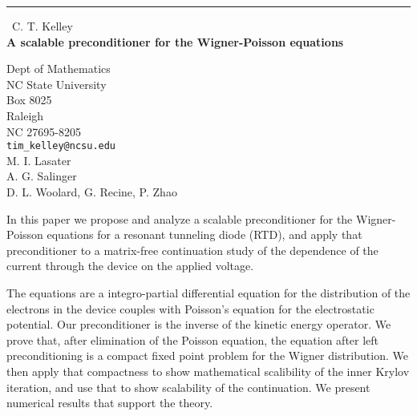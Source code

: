 \documentclass{report}
\begin{document}
\begin{center}
\rule{6in}{1pt} \
{\large C. T. Kelley \\
{\bf A scalable preconditioner for the Wigner-Poisson equations}}

Dept of Mathematics \\ NC State University \\ Box 8025 \\ Raleigh \\ NC 27695-8205
\\
{\tt tim_kelley@ncsu.edu}\\
M. I. Lasater\\
A. G. Salinger\\
	D. L. Woolard, G. Recine, P. Zhao\end{center}

In this paper we propose and analyze a scalable preconditioner for
the Wigner-Poisson equations for a resonant tunneling diode (RTD), and
apply that preconditioner to a matrix-free continuation study of the
dependence of the current through the device on the applied voltage.

The equations are a integro-partial differential equation for the
distribution of the electrons in the device couples with Poisson's
equation for the electrostatic potential. Our preconditioner is the
inverse of the kinetic energy operator. We prove that, after elimination
of the Poisson equation, the equation after left preconditioning is a
compact fixed point problem for the Wigner distribution. We then apply
that compactness to show mathematical scalibility of the inner Krylov
iteration, and use that to show scalability of the continuation. We
present numerical results that support the theory.
\end{document}
